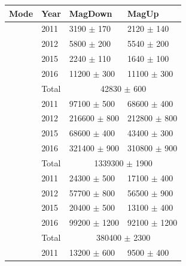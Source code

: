 \begin{table}[!h]
   \begin{center}
      \begin{tabular}{llll}
         \hline
         Mode                       & Year   & MagDown            & MagUp           \\ 
         \hline                                                
         \decay{\phiz}{\Kp\Km}      & 2011   & 3190 $\pm$ 170     &   2120 $\pm$ 140 \\
                                    & 2012   & 5800 $\pm$ 200     &   5540 $\pm$ 200 \\
                                    & 2015   & 2240 $\pm$ 110     &   1640 $\pm$ 100 \\
                                    & 2016   & 11200 $\pm$ 300    &   11100 $\pm$ 300 \\
                                    & Total  & \multicolumn{2}{c}{42830 $\pm$ 600}\\
         \hline                                                
         \decay{\Dsp}{\Kp\Km\pip}   & 2011   & 97100  $\pm$ 500   & 68600  $\pm$ 400 \\
                                    & 2012   & 216600 $\pm$ 800   & 212800 $\pm$ 800 \\
                                    & 2015   & 68600  $\pm$ 400   & 43400  $\pm$ 300 \\
                                    & 2016   & 321400 $\pm$ 900   & 310800 $\pm$ 900 \\
                                    & Total  & \multicolumn{2}{c}{1339300 $\pm$ 1900}\\
         \hline                                                
         \decay{\Dsp}{\pip\pim\pip} & 2011   & 24300 $\pm$ 500    &   17100 $\pm$ 400 \\
                                    & 2012   & 57700 $\pm$ 800    &   56500 $\pm$ 900 \\
                                    & 2015   & 20400 $\pm$ 500    &   13100 $\pm$ 400 \\
                                    & 2016   & 99200 $\pm$ 1200   &  92100 $\pm$ 1200 \\
                                    & Total  & \multicolumn{2}{c}{380400 $\pm$ 2300}\\
         \hline                                                
         \decay{\Dsp}{\Kp\pim\pip}  & 2011   & 13200 $\pm$ 600    & 9500  $\pm$ 400 \\

\end{tabular}
\end{center}
\end{table}
